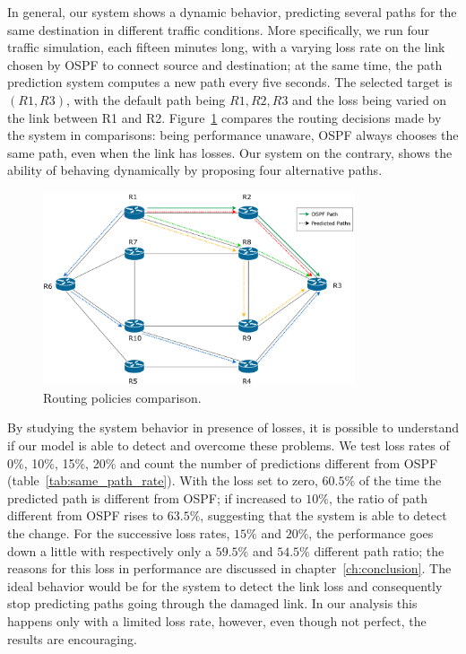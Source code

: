 In general, our system shows a dynamic behavior, predicting several paths for the same destination in different traffic conditions. More specifically, we run four traffic simulation, each fifteen minutes long, with a varying loss rate on the link chosen by OSPF to connect source and destination; at the same time, the path prediction system computes a new path every five seconds. The selected target is $(R1, R3)$, with the default path being $R1,R2,R3$ and the loss being varied on the link between R1 and R2. Figure~\ref{fig:path_cmp} compares the routing decisions made by the system in comparisons: being performance unaware, OSPF always chooses the same path, even when the link has losses. Our system on the contrary, shows the ability of behaving dynamically by proposing four alternative paths.

\begin{figure}[h]
\centering
\includegraphics[width=0.82\textwidth]{img/path_comparison}
\caption{Routing policies comparison.}
\label{fig:path_cmp}
\end{figure}
By studying the system behavior in presence of losses, it is possible to understand if our model is able to detect and overcome these problems. We test loss rates of 0\%, 10\%, 15\%, 20\% and count the number of predictions different from OSPF (table~\ref{tab:same_path_rate}). With the loss set to zero, $60.5\%$ of the time the predicted path is different from OSPF; if increased to $10\%$, the ratio of path different from OSPF rises to $63.5\%$, suggesting that the system is able to detect the change. For the successive loss rates, $15\%$ and $20\%$, the performance goes down a little with respectively only a $59.5\%$ and $54.5\%$ different path ratio; the reasons for this loss in performance are discussed in chapter~\ref{ch:conclusion}. The ideal behavior would be for the system to detect the link loss and consequently stop predicting paths going through the damaged link. In our analysis this happens only with a limited loss rate, however, even though not perfect, the results are encouraging.

